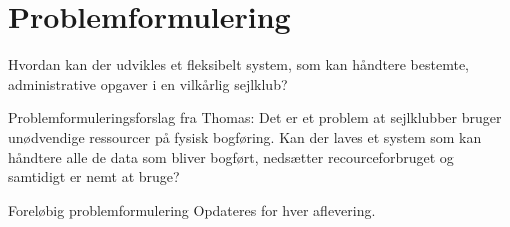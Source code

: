 \chapter{Problemformulering}\label{chap:problemformulering}

\cbstart

Hvordan kan der udvikles et fleksibelt system, som kan håndtere bestemte, administrative opgaver i en vilkårlig sejlklub?

Problemformuleringsforslag fra Thomas:
Det er et problem at sejlklubber bruger unødvendige ressourcer på fysisk bogføring. Kan der laves et system som kan håndtere alle de data som bliver bogført, nedsætter recourceforbruget og samtidigt er nemt at bruge? 


\begin{anfxnote}{Foreløbig problemformulering}
  Opdateres for hver aflevering.
\end{anfxnote}

\cbend
